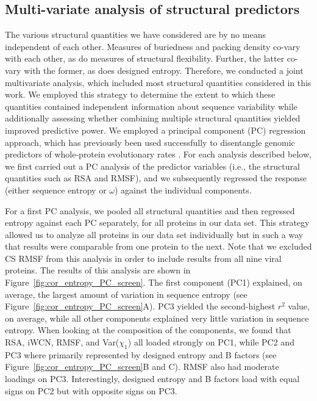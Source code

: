 \documentclass[smallextended]{svjour3}
\begin{document}
 
\subsection*{Multi-variate analysis of structural predictors}

The various structural quantities we have considered are by no means independent of each other. Measures of buriedness and packing density co-vary with each other, as do measures of structural flexibility. Further, the latter co-vary with the former, as does designed entropy. Therefore, we conducted a joint multivariate analysis, which included most structural quantities considered in this work. We employed this strategy to determine the extent to which these quantities contained independent information about sequence variability while additionally
assessing whether combining multiple structural quantities yielded improved predictive power. We employed a principal component (PC) regression approach, which has previously been used successfully to disentangle genomic predictors of whole-protein evolutionary rates \citep{Drummondetal2006,Bloometal2006}. For each analysis described below, we first carried out a PC analysis of the predictor variables (i.e., the structural quantities such as RSA and RMSF), and we subsequently regressed the response (either sequence entropy or $\omega$) against the individual components.

For a first PC analysis, we pooled all structural quantities and then regressed entropy against each PC separately, for all proteins in our data set. This strategy allowed us to analyze all proteins in our data set individually but in such a way that results were comparable from one protein to the next. Note that we excluded CS RMSF from this analysis in order to include results from all nine viral proteins. The results of this analysis are shown in Figure~\ref{fig:cor_entropy_PC_screen}. The first component (PC1) explained, on average, the largest amount of variation in sequence entropy (see Figure~\ref{fig:cor_entropy_PC_screen}A). PC3 yielded the second-highest $r^2$ value, on average, while all other components explained very little variation in sequence entropy. When looking at the composition of the components, we found that RSA, iWCN, RMSF, and Var($\chi_1$) all loaded strongly on PC1, while PC2 and PC3 where primarily represented by designed entropy and B factors (see Figure~\ref{fig:cor_entropy_PC_screen}B and C). RMSF also had moderate loadings on PC3. Interestingly, designed entropy and B factors load with equal signs on PC2 but with opposite signs on PC3.
\end{document}
